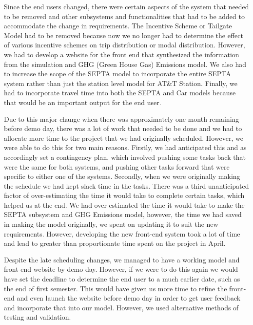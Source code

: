 Since the end users changed, there were certain aspects of the system that needed to be removed and other subsystems and functionalities that had to be added to accommodate the change in requirements. The Incentive Scheme or Tailgate Model had to be removed because now we no longer had to determine the effect of various incentive schemes on trip distribution or modal distribution. However, we had to develop a website for the front end that synthesized the information from the simulation and GHG (Green House Gas) Emissions model. We also had to increase the scope of the SEPTA model to incorporate the entire SEPTA system rather than just the station level model for AT&T Station. Finally, we had to incorporate travel time into both the SEPTA and Car models because that would be an important output for the end user.

Due to this major change when there was approximately one month remaining before demo day, there was a lot of work that needed to be done and we had to allocate more time to the project that we had originally scheduled. However, we were able to do this for two main reasons. Firstly, we had anticipated this and as accordingly set a contingency plan, which involved pushing some tasks back that were the same for both systems, and pushing other tasks forward that were specific to either one of the systems. Secondly, when we were originally making the schedule we had kept slack time in the tasks. There was a third unanticipated factor of over-estimating the time it would take to complete certain tasks, which helped us at the end. We had over-estimated the time it would take to make the SEPTA subsystem and GHG Emissions model, however, the time we had saved in making the model originally, we spent on updating it to suit the new requirements. However, developing the new front-end system took a lot of time and lead to greater than proportionate time spent on the project in April.

Despite the late scheduling changes, we managed to have a working model and front-end website by demo day. However, if we were to do this again we would have set the deadline to determine the end user to a much earlier date, such as the end of first semester. This would have given us more time to refine the front-end and even launch the website before demo day in order to get user feedback and incorporate that into our model. However, we used alternative methods of testing and validation.


